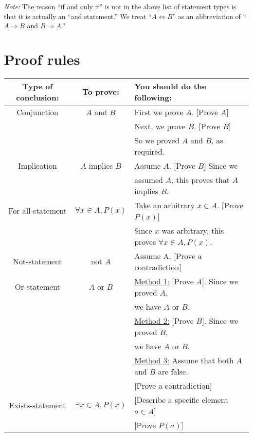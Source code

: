 \documentclass[11pt]{article}
\begin{document}
\begin{enumerate}
        \emph{Note:} The reason ``if and only if'' is not in the above list of statement types is that it is actually an ``and statement.'' We treat ``\(A \Leftrightarrow B\)'' as an abbreviation of ``\(A \Rightarrow B\) and \(B \Rightarrow A\).''
    \end{enumerate}

    \section{Proof rules}

    \begin{center}
        \begin{tabular}{c c l}
            Type of conclusion: & To prove: & You should do the following: \\ \hline
            Conjunction & $A$ and $B$ & First we prove $A$. [Prove $A$] \\
            && Next, we prove $B$. [Prove $B$] \\
            && So we proved $A$ and $B$, as required. \\ \hline
            Implication & $A$ implies $B$ & Assume $A$. [Prove $B$] Since we \\
            && assumed $A$, this proves that $A$ implies $B$. \\ \hline
            For all-statement & \(\forall x \in A, P(x)\) & Take an arbitrary $x \in A$. [Prove \(P(x)\)] \\
            && Since $x$ was arbitrary, this proves \(\forall x \in A, P(x)\). \\ \hline
            Not-statement & not $A$ & Assume A. [Prove a contradiction] \\ \hline
            Or-statement & $A$ or $B$ & \underline{Method 1:} [Prove $A$]. Since we proved $A$, \\
            && we have $A$ or $B$. \\
            && \underline{Method 2:} [Prove $B$]. Since we proved $B$, \\
            && we have $A$ or $B$. \\
            && \underline{Method 3:} Assume that both $A$ and $B$ are false. \\
            && [Prove a contradiction] \\ \hline
            Exists-statement & \(\exists x \in A, P(x)\) & [Describe a specific element $a \in A$] \\
            && [Prove \(P(a)\)]
        \end{tabular}
    \end{center}
\end{document}
